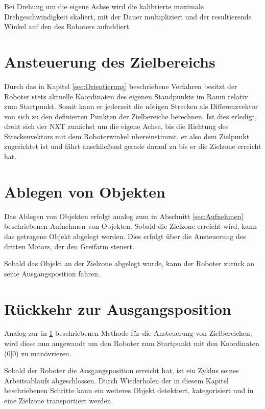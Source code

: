 Bei Drehung um die eigene Achse wird die kalibrierte maximale Drehgeschwindigkeit skaliert, mit der Dauer multipliziert und der resultierende Winkel auf den des Roboters aufaddiert.

\section{Ansteuerung des Zielbereichs}
\label{sec:Zielbereichsansteuerung}

Durch das in Kapitel \ref{sec:Orientierung} beschriebene Verfahren besitzt der Roboter stets aktuelle Koordinaten des eigenen Standpunkts im Raum relativ zum Startpunkt. Somit kann er jederzeit die nötigen Strecken als Differenzvektor von sich zu den definierten Punkten der Zielbereiche berechnen. Ist dies erledigt, dreht sich der NXT zunächst um die eigene Achse, bis die Richtung des Streckenvektors mit dem Roboterwinkel übereinstimmt, er also dem Zielpunkt zugerichtet ist und fährt anschließend gerade darauf zu bis er die Zielzone erreicht hat.


\section{Ablegen von Objekten}

Das Ablegen von Objekten erfolgt analog zum in Abschnitt \ref{sec:Aufnehmen} beschriebenen Aufnehmen von Objekten. Sobald die Zielzone erreicht wird, kann das getragene Objekt abgelegt werden. Dies erfolgt über die Ansteuerung des dritten Motors, der den Greifarm steuert. 

Sobald das Objekt an der Zielzone abgelegt wurde, kann der Roboter zurück an seine Ausgangsposition fahren. 

\section{Rückkehr zur Ausgangsposition}

Analog zur in \ref{sec:Zielbereichsansteuerung} beschriebenen Methode für die Ansteuerung von Zielbereichen, wird diese nun angewandt um den Roboter zum Startpunkt mit den Koordinaten (0|0) zu manövrieren.

Sobald der Roboter die Ausgangsposition erreicht hat, ist ein Zyklus seines Arbeitsablaufs abgeschlossen. Durch Wiederholen der in diesem Kapitel beschriebenen Schritte kann ein weiteres Objekt detektiert, kategorisiert und in eine Zielzone transportiert werden. 
